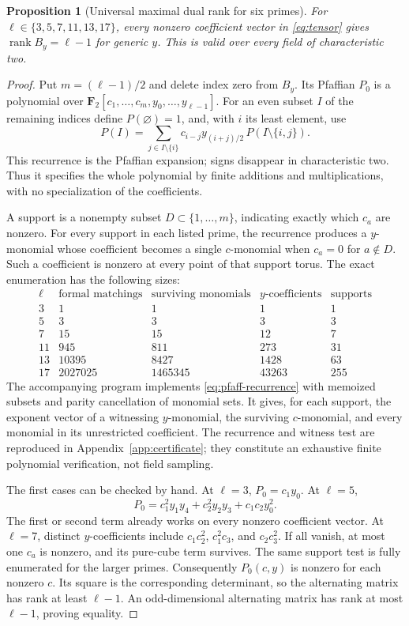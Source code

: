 \documentclass[11pt]{article}
\newtheorem{proposition}[theorem]{Proposition}
\theoremstyle{definition}\newtheorem{definition}[theorem]{Definition}
\theoremstyle{remark}\newtheorem{remark}[theorem]{Remark}
\newcommand{\FF}{\mathbf F}
\newcommand{\rk}{\operatorname{rank}}
\begin{document}
\begin{proposition}[Universal maximal dual rank for six primes]\label{prop:certificate}
For $\ell\in\{3,5,7,11,13,17\}$, every nonzero coefficient vector in \eqref{eq:tensor} gives $\rk B_y=\ell-1$ for generic $y$. This is valid over every field of characteristic two.
\end{proposition}
\begin{proof}
Put $m=(\ell-1)/2$ and delete index zero from $B_y$. Its Pfaffian $P_0$ is a polynomial over $\FF_2[c_1,\ldots,c_m,y_0,\ldots,y_{\ell-1}]$. For an even subset $I$ of the remaining indices define $P(\varnothing)=1$, and, with $i$ its least element, use
\begin{equation}\label{eq:pfaff-recurrence}
 P(I)=\sum_{j\in I\setminus\{i\}}
 c_{i-j}y_{(i+j)/2}\,P(I\setminus\{i,j\}).
\end{equation}
This recurrence is the Pfaffian expansion; signs disappear in characteristic two. Thus it specifies the whole polynomial by finite additions and multiplications, with no specialization of the coefficients.

A support is a nonempty subset $D\subset\{1,\ldots,m\}$, indicating exactly which $c_a$ are nonzero. For every support in each listed prime, the recurrence produces a $y$-monomial whose coefficient becomes a single $c$-monomial when $c_a=0$ for $a\notin D$. Such a coefficient is nonzero at every point of that support torus. The exact enumeration has the following sizes:
\[
\begin{array}{c|r|r|r|r}
\ell&\text{formal matchings}&\text{surviving monomials}
 &\text{$y$-coefficients}&\text{supports}\\ \hline
3&1&1&1&1\\
5&3&3&3&3\\
7&15&15&12&7\\
11&945&811&273&31\\
13&10395&8427&1428&63\\
17&2027025&1465345&43263&255
\end{array}
\]
The accompanying program implements \eqref{eq:pfaff-recurrence} with memoized subsets and parity cancellation of monomial sets. It gives, for each support, the exponent vector of a witnessing $y$-monomial, the surviving $c$-monomial, and every monomial in its unrestricted coefficient. The recurrence and witness test are reproduced in Appendix~\ref{app:certificate}; they constitute an exhaustive finite polynomial verification, not field sampling.

The first cases can be checked by hand. At $\ell=3$, $P_0=c_1y_0$. At $\ell=5$,
\[
 P_0=c_1^2y_1y_4+c_2^2y_2y_3+c_1c_2y_0^2.
\]
The first or second term already works on every nonzero coefficient vector. At $\ell=7$, distinct $y$-coefficients include $c_1c_2^2$, $c_1^2c_3$, and $c_2c_3^2$. If all vanish, at most one $c_a$ is nonzero, and its pure-cube term survives. The same support test is fully enumerated for the larger primes. Consequently $P_0(c,y)$ is nonzero for each nonzero $c$. Its square is the corresponding determinant, so the alternating matrix has rank at least $\ell-1$. An odd-dimensional alternating matrix has rank at most $\ell-1$, proving equality.
\end{proof}
\end{document}
